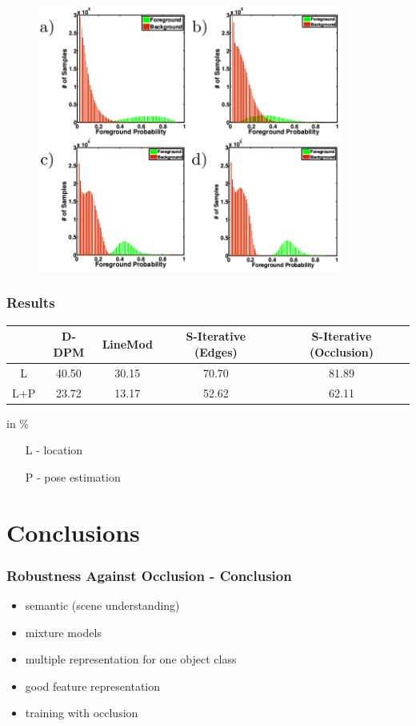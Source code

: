 \documentclass[xcolor=dvipsnames]{beamer}
\begin{document}
\begin{frame}
	\begin{figure}
	\includegraphics[width=10cm]{img/rir_1.png}
	\end{figure}
\end{frame}

\begin{frame}
	\frametitle{Results}
	
	\begin{center}
		\small
		\begin{tabular}{c|c|c|c|c}
			& D-DPM & LineMod & S-Iterative (Edges) & S-Iterative (Occlusion) \\
			\hline
			L & 40.50 & 30.15 & 70.70 & 81.89 \\
			L+P & 23.72 & 13.17 & 52.62 & 62.11 \\
		\end{tabular}
		in $\%$
		\begin{itemize}
			\item[L - ] location
			\item[P - ] pose estimation
		\end{itemize}
	\end{center}
\end{frame}

\section{Conclusions}
\begin{frame}
	\frametitle{Robustness Against Occlusion - Conclusion}
	\Large
	\begin{itemize}
		\item semantic (scene understanding)
		\item mixture models
		\item multiple representation for one object class
		\item good feature representation
		\item training with occlusion
	\end{itemize}
\end{frame}
\end{document}
